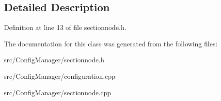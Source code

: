 \subsection{Detailed Description}


Definition at line 13 of file sectionnode.\+h.



The documentation for this class was generated from the following files\+:\begin{DoxyCompactItemize}
\item 
src/\+Config\+Manager/sectionnode.\+h\item 
src/\+Config\+Manager/configuration.\+cpp\item 
src/\+Config\+Manager/sectionnode.\+cpp\end{DoxyCompactItemize}
